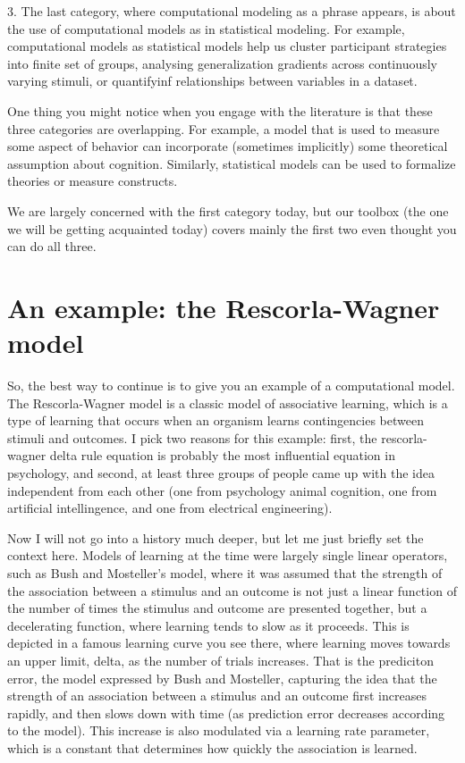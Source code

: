 \documentclass[12pt]{article}
\begin{document}
3.  The last category, where computational modeling as a phrase appears, is about the use of computational models as in statistical modeling. For example, computational models as statistical models help us cluster participant strategies into finite set of groups, analysing generalization gradients across continuously varying stimuli, or quantifyinf relationships between variables in a dataset. 

One thing you might notice when you engage with the literature is that these three categories are overlapping. For example, a model that is used to measure some aspect of behavior can incorporate (sometimes implicitly) some theoretical assumption about cognition. Similarly, statistical models can be used to formalize theories or measure constructs.

We are largely concerned with the first category today, but our toolbox (the one we will be getting acquainted today) covers mainly the first two even thought you can do all three.

\section{An example: the Rescorla-Wagner model}

So, the best way to continue is to give you an example of a computational model. The Rescorla-Wagner model is a classic model of associative learning, which is a type of learning that occurs when an organism learns contingencies between stimuli and outcomes. I pick two reasons for this example: first, the rescorla-wagner delta rule equation is probably the most influential equation in psychology, and second, at least three groups of people came up with the idea independent from each other (one from psychology animal cognition, one from artificial intellingence, and one from electrical engineering).

Now I will not go into a history much deeper, but let me just briefly set the context here. Models of learning at the time were largely single linear operators, such as Bush and Mosteller's model, where it was assumed that the strength of the association between a stimulus and an outcome is not just a linear function of the number of times the stimulus and outcome are presented together, but a decelerating function, where learning tends to slow as it proceeds. This is depicted in a famous learning curve you see there, where learning moves towards an upper limit, delta, as the number of trials increases. That is the prediciton error, the model expressed by Bush and Mosteller, capturing the idea that the strength of an association between a stimulus and an outcome first increases rapidly, and then slows down with time (as prediction error decreases according to the model). This increase is also modulated via a learning rate parameter, which is a constant that determines how quickly the association is learned.
\end{document}
